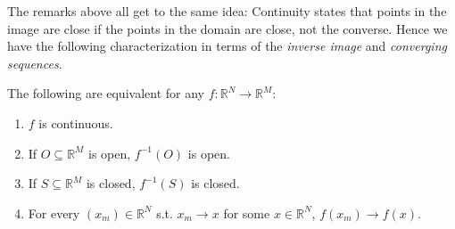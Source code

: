 \documentclass{article}
\begin{document}
The remarks above all get to the same idea: Continuity states that points in the image are close if the points in the domain are close, not the converse. Hence we have the following characterization in terms of the \textit{inverse image} and \textit{converging sequences}.
\begin{theorem}\label{thm:lecture2_continuity_open_closed}
  The following are equivalent for any $f: \mathbb{R}^N \to \mathbb{R}^M$:
  \begin{enumerate}
    \item $f$ is continuous.

    \item If $O \subseteq \mathbb{R}^M$ is open, $f^{-1}(O)$ is open.

    \item If $S \subseteq \mathbb{R}^M$ is closed, $f^{-1}(S)$ is closed.

    \item For every $(x_m) \in \mathbb{R}^N$ s.t. $x_m \to x$ for some $x \in \mathbb{R}^N$, $f(x_m) \to f(x)$.
  \end{enumerate}
\end{theorem}
\end{document}
